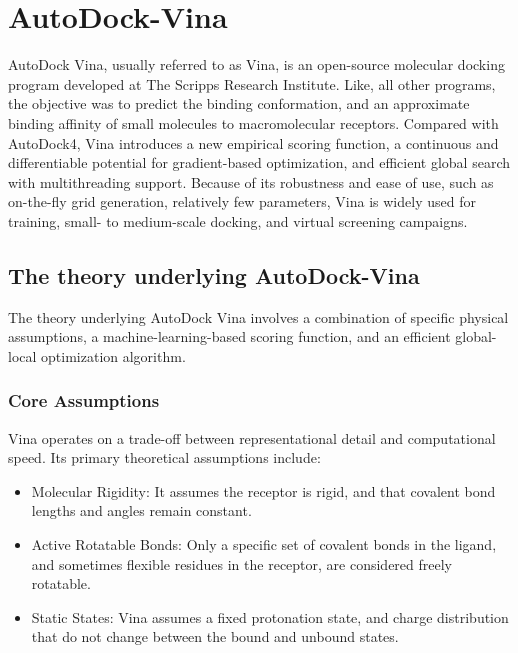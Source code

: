 \documentclass[12pt, a4paper]{article}
\begin{document}
\section{AutoDock-Vina}

AutoDock Vina, usually referred to as Vina, is an open-source molecular docking program developed at The Scripps Research Institute. Like, all other programs, the objective was to predict the binding conformation, and an approximate binding affinity of small molecules to macromolecular receptors\cite{CH7_trott2010vina}.
Compared with AutoDock4, Vina introduces a new empirical scoring function, a continuous and differentiable potential for gradient-based optimization, and efficient global search with multithreading support\cite{CH7_trott2010vina,CH7_forli2016autodock}. Because of its robustness and ease of use, such as on-the-fly grid generation, relatively few parameters, Vina is widely used for training, small- to medium-scale docking, and virtual screening campaigns.

\subsection{The theory underlying AutoDock-Vina}
The theory underlying AutoDock Vina involves a combination of specific physical assumptions, a machine-learning-based scoring function, and an efficient global-local optimization algorithm.

\subsubsection{Core Assumptions}
Vina operates on a trade-off between representational detail and computational speed. Its primary theoretical assumptions include:
\begin{itemize}
\item Molecular Rigidity: It assumes the receptor is rigid, and that covalent bond lengths and angles remain constant.
\item Active Rotatable Bonds: Only a specific set of covalent bonds in the ligand, and sometimes flexible residues in the receptor, are considered freely rotatable.
\item Static States: Vina assumes a fixed protonation state, and charge distribution that do not change between the bound and unbound states.
\end{itemize}
\end{document}
